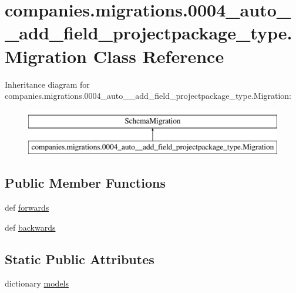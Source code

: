 \hypertarget{classcompanies_1_1migrations_1_10004__auto____add__field__projectpackage__type_1_1_migration}{\section{companies.\-migrations.0004\-\_\-auto\-\_\-\-\_\-add\-\_\-field\-\_\-projectpackage\-\_\-type.Migration Class Reference}
\label{classcompanies_1_1migrations_1_10004__auto____add__field__projectpackage__type_1_1_migration}
}
Inheritance diagram for companies.\-migrations.0004\-\_\-auto\-\_\-\-\_\-add\-\_\-field\-\_\-projectpackage\-\_\-type.Migration\-:\begin{figure}[H]
\begin{center}
\leavevmode
\includegraphics[height=2.000000cm]{classcompanies_1_1migrations_1_10004__auto____add__field__projectpackage__type_1_1_migration}
\end{center}
\end{figure}
\subsection*{Public Member Functions}
\begin{DoxyCompactItemize}
\item 
def \hyperlink{classcompanies_1_1migrations_1_10004__auto____add__field__projectpackage__type_1_1_migration_aac4fc7ae2bd381e3552cc32d4b0de923}{forwards}
\item 
def \hyperlink{classcompanies_1_1migrations_1_10004__auto____add__field__projectpackage__type_1_1_migration_a1ed36d4643960ce5fc2a01a741507885}{backwards}
\end{DoxyCompactItemize}
\subsection*{Static Public Attributes}
\begin{DoxyCompactItemize}
\item 
dictionary \hyperlink{classcompanies_1_1migrations_1_10004__auto____add__field__projectpackage__type_1_1_migration_ab185fb082a0393fdc6d12a3a3e465df2}{models}
\end{DoxyCompactItemize}


